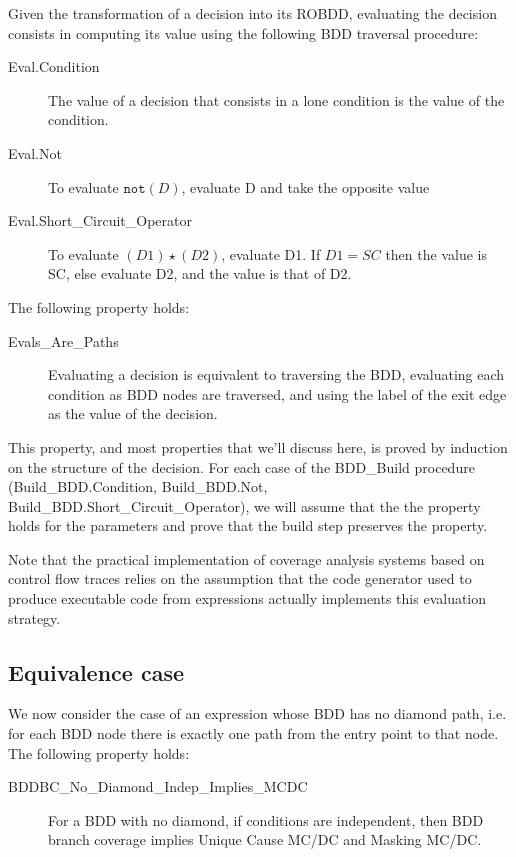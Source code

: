 \documentclass[a4paper,12pt,twoside]{article}
\newcommand{\anysc}{\star}
\newcommand{\adanot}{\texttt{not}}
\begin{document}
Given the transformation of a decision into its ROBDD, evaluating the
decision consists in computing its value using the following BDD traversal
procedure:

\begin{description}
\item[Eval.Condition]
  The value of a decision that consists in a lone condition is the
  value of the condition.

\item[Eval.Not]
  To evaluate $\adanot{} (D)$, evaluate D and take the opposite value

\item[Eval.Short\_Circuit\_Operator]
  To evaluate $(D1) \anysc{} (D2)$, evaluate D1. If $D1 = SC$ then the
  value is SC, else evaluate D2, and the value is that of D2.
\end{description}

The following property holds:

\begin{description}
\item[Evals\_Are\_Paths]
  Evaluating a decision is equivalent to traversing the BDD, evaluating
  each condition as BDD nodes are traversed, and using the label of the
  exit edge as the value of the decision.
\end{description}

This property, and most properties that we'll discuss here, is proved
by induction on the structure of the decision.  For each case of the
BDD\_Build procedure (Build\_BDD.Condition, Build\_BDD.Not,
Build\_BDD.Short\_Circuit\_Operator), we will assume that the the
property holds for the parameters and prove that the build step
preserves the property.

Note that the practical implementation of coverage analysis systems based
on control flow traces relies on the assumption that the code generator
used to produce executable code from expressions actually implements this
evaluation strategy.

\subsection{Equivalence case}

We now consider the case of an expression whose BDD has no diamond path,
i.e. for each BDD node there is exactly one path from the entry point to
that node. The following property holds:

\begin{description}
\item[BDDBC\_No\_Diamond\_Indep\_Implies\_MCDC]
  For a BDD with no diamond, if conditions are independent, then
  BDD branch coverage implies Unique Cause MC/DC and Masking MC/DC.
\end{description}
\end{document}
